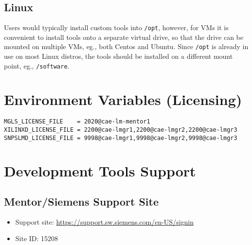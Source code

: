 \documentclass[10pt,twoside]{article}
\begin{document}
\subsection{Linux}

Users would typically install custom tools into \verb+/opt+, however, for VMs
it is convenient to install tools onto a separate virtual drive, so that the
drive can be mounted on multiple VMs, eg., both Centos and Ubuntu.
Since \verb+/opt+ is already in use on most Linux distros, the tools
should be installed on a different mount point, eg., \verb+/software+.

\section{Environment Variables (Licensing)}

\begin{verbatim}
MGLS_LICENSE_FILE    = 2020@cae-lm-mentor1
XILINXD_LICENSE_FILE = 2200@cae-lmgr1,2200@cae-lmgr2,2200@cae-lmgr3
SNPSLMD_LICENSE_FILE = 9998@cae-lmgr1,9998@cae-lmgr2,9998@cae-lmgr3
\end{verbatim}

\clearpage
\section{Development Tools Support}

\subsection{Mentor/Siemens Support Site}

\begin{itemize}
\item Support site:
\href{https://support.sw.siemens.com/en-US/signin}{https://support.sw.siemens.com/en-US/signin}
\item Site ID: 15208
\end{itemize}
\end{document}
